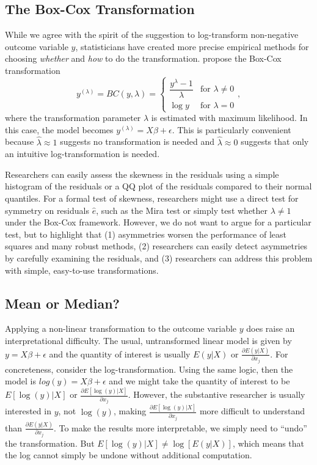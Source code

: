 \documentclass[12pt]{article}
\begin{document}
\subsection*{The Box-Cox Transformation}

While we agree with the spirit of the suggestion to log-transform non-negative outcome variable $y$, statisticians have created more precise empirical methods for choosing \textit{whether} and \textit{how} to do the transformation. 
\cite{BoxCox1964} propose the Box-Cox transformation 
\begin{displaymath}
   y^{(\lambda)} = BC(y, \lambda) = \left\{
     \begin{array}{lr}
       \dfrac{y^\lambda - 1}{\lambda} & \text{for } \lambda \neq 0\\
       \log y & \text{for } \lambda = 0
     \end{array}
   \right.,
\end{displaymath}
\noindent where the transformation parameter $\lambda$ is estimated with maximum likelihood. 
In this case, the model becomes $y^{(\lambda)} = X\beta + \epsilon$. 
This is particularly convenient because $\hat{\lambda} \approx 1$ suggests no transformation is needed and $\hat{\lambda} \approx 0$ suggests that only an intuitive log-transformation is needed.

Researchers can easily assess the skewness in the residuals using a simple histogram of the residuals or a QQ plot of the residuals compared to their normal quantiles. 
For a formal test of skewness, researchers might use a direct test for symmetry on residuals $\hat{e}$, such as the Mira test \citep{Mira1999} or simply test whether $\lambda \neq 1$ under the Box-Cox framework. 
However, we do not want to argue for a particular test, but to highlight that (1) asymmetries worsen the performance of least squares and many robust methods, (2) researchers can easily detect asymmetries by carefully examining the residuals, and (3) researchers can address this problem with simple, easy-to-use transformations.

\subsection*{Mean or Median?}

Applying a non-linear transformation to the outcome variable $y$ does raise an interpretational difficulty. 
The usual, untransformed linear model is given by $y = X\beta + \epsilon$ and the quantity of interest is usually $E(y | X)$ or $\frac{\partial E(y | X)}{\partial x_j}$. 
For concreteness, consider the log-transformation. 
Using the same logic, then the model is $log(y) = X\beta + \epsilon$ and we might take the quantity of interest to be $E[\log(y) | X]$ or $\frac{\partial E[\log(y) | X]}{\partial x_j}$. 
However, the substantive researcher is usually interested in $y$, not $\log(y)$, making $\frac{\partial E[\log(y) | X]}{\partial x_j}$ more difficult to understand than $\frac{\partial E(y | X)}{\partial x_j}$. 
To make the results more interpretable, we simply need to ``undo'' the transformation. 
But $E[\log(y) | X] \neq \log [E(y | X)]$, which means that the log cannot simply be undone without additional computation.
\end{document}
